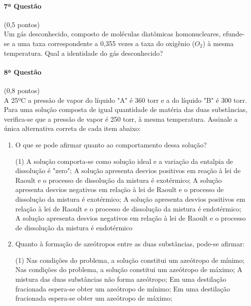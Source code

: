 \documentclass[12pt,a4paper]{article}
\begin{document}
\paragraph{7ª Questão} (0,5 pontos)\\
Um gás desconhecido, composto de moléculas diatômicas homonucleares, efunde-se a uma taxa correspondente a 0,355 vezes a taxa do oxigênio ($O_2$) à mesma temperatura. Qual a identidade do gás desconhecido?

\paragraph{8ª Questão} (0,8 pontos)\\
A 25ºC a pressão de vapor do líquido "A" é 360 torr e a do líquido "B" é 300 torr. Para uma solução composta de igual quantidade de matéria das duas substâncias, verifica-se que a pressão de vapor é 250 torr, à mesma temperatura. Assinale a única alternativa correta de cada item abaixo:

\begin{enumerate}[label=\roman*.]
\item O que se pode afirmar quanto ao comportamento dessa solução? 

\begin{tasks}(1)
\task A solução comporta-se como solução ideal e a variação da entalpia de dissolução é "zero";
\task A solução apresenta desvios positivos em reação à lei de Raoult e o processo de dissolução da mistura é exotérmico;
\task A solução apresenta desvios negativos em relação à lei de Raoult e o processo de dissolução da mistura é exotérmico;
\task A solução apresenta desvios positivos em relação à lei de Raoult e o processo de dissolução da mistura é endotérmico;
\task A solução apresenta desvios negativos em relação à lei de Raoult e o processo de dissolução da mistura é endotérmico
\end{tasks}

\item Quanto à formação de azeótropos entre as duas substâncias, pode-se afirmar:
\begin{tasks}(1)
\task Nas condições do problema, a solução constitui um azeótropo de mínimo; 
\task Nas condições do problema, a solução constitui um azeótropo de máximo;
\task A mistura das duas substâncias não forma azeótropo;
\task Em uma destilação fracionada espera-se obter um azeótropo de mínimo;
\task Em uma destilação fracionada espera-se obter um azeótropo de máximo;
\end{tasks}

\end{enumerate}
\end{document}
